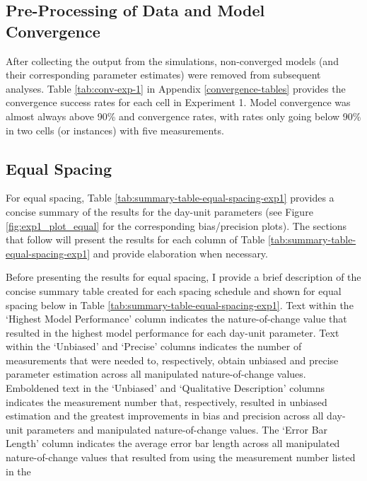 \documentclass[
12pt, %
twoside,
english]{guelphthesis}
\begin{document}
\hypertarget{pre-processing-of-data-and-model-convergence}{%
\subsection{Pre-Processing of Data and Model Convergence}\label{pre-processing-of-data-and-model-convergence}}

After collecting the output from the simulations, non-converged models (and their corresponding parameter estimates) were removed from subsequent analyses. Table \ref{tab:conv-exp-1} in Appendix \ref{convergence-tables} provides the convergence success rates for each cell in Experiment 1. Model convergence was almost always above 90\% and convergence rates, with rates only going below 90\% in two cells (or instances) with five measurements.

\hypertarget{concise-tab}{%
\subsection{Equal Spacing}\label{concise-tab}}

For equal spacing, Table \ref{tab:summary-table-equal-spacing-exp1} provides a concise summary of the results for the day-unit parameters (see Figure \ref{fig:exp1_plot_equal} for the corresponding bias/precision plots). The sections that follow will present the results for each column of Table \ref{tab:summary-table-equal-spacing-exp1} and provide elaboration when necessary.

Before presenting the results for equal spacing, I provide a brief description of the concise summary table created for each spacing schedule and shown for equal spacing below in Table \ref{tab:summary-table-equal-spacing-exp1}. Text within the `Highest Model Performance' column indicates the nature-of-change value that resulted in the highest model performance for each day-unit parameter. Text within the `Unbiased' and `Precise' columns indicates the number of measurements that were needed to, respectively, obtain unbiased and precise parameter estimation across all manipulated nature-of-change values. Emboldened text in the `Unbiased' and `Qualitative Description' columns indicates the measurement number that, respectively, resulted in unbiased estimation and the greatest improvements in bias and precision across all day-unit parameters and manipulated nature-of-change values. The `Error Bar Length' column indicates the average error bar length across all manipulated nature-of-change values that resulted from using the measurement number listed in the
\end{document}
